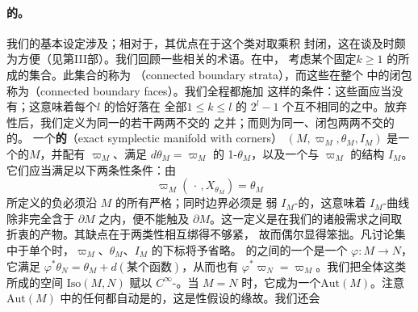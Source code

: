 \paragraph{\trCorneredBoundary{}的\trExactSymplectic\trManifold。}\label{sub:exact-symplectic-with-corners}
我们的基本设定涉及\trCorneredBoundary\trManifold；相对于\trManifoldWithBoundary，其优点在于这个类对取乘积%
封闭，这在谈及\trFibration{}时颇为方便（见第III部）。我们回顾一些相关的术语。在\trCorneredBoundary\trManifold{}中，
考虑某个固定\trCodimension{}$k\ge 1$ 的\trCornerPoint{}所成的集合。此集合的\trConnectedComponent{}称为%
\textbf{\trConnected\trBoundaryStratum}（connected boundary strata），而这些\trStratum{}在整个%
\trManifold{}中的闭包称为\textbf{\trConnected\trBoundaryFace}（connected boundary faces）。我们全程都施加
这样的条件：这些面应当没有\trSelfIntersection；这意味着每个\trCodimension{}$l$ 的\trCornerPoint{}恰好落在
全部\trCodimension{}$1\le k\le l$ 的 $2^l-1$ 个互不相同的\trConnected\trBoundaryFace{}之中。放弃%
\trConnected{}性后，我们定义\trBoundaryFace{}为同一\trCodimension{}的若干两两不交的%
\trConnected\trBoundaryFace{}之并；而\trBoundaryStratum{}则为同一\trCodimension{}、闭包两两不交的%
\trConnected\trBoundaryStratum{}的\trDisjointUnion。
一个\textbf{\trCorneredBoundary{}的\trExactSymplectic\trManifold}（exact symplectic manifold with corners）%
$(M,\varpi_M,\theta_M,I_M)$ 是一个\trCompact\trSmooth{}的\trCorneredBoundary\trManifold{}$M$，并配有%
\trSymplecticForm{}$\varpi_M$、满足 $d\theta_M=\varpi_M$ 的 1-\trForm{}$\theta_M$，以及一个与 $\varpi_M$%
\trCompatible{}的\trAlmostComplex{}结构 $I_M$。它们应当满足以下两条\trConvex{}性条件：由
\begin{equation*}
\varpi_M(\,\cdot\,,X_{\theta_M})=\theta_M
\end{equation*}
所定义的负\trLiouville\trVectorField{}必须沿 $M$ 的所有\trBoundaryFace{}严格\trIncoming；同时边界必须是%
弱 $I_M$-\trConvex{}的，这意味着 $I_M$-\trHolomorphic{}曲线除非完全含于 $\partial M$ 之内，便不能触及
$\partial M$。这一定义是在我们的诸般需求之间取折衷的产物。其缺点在于两类\trConvex{}性相互绑得不够紧，
故而偶尔显得笨拙。凡讨论集中于单个\trManifold{}时，$\varpi_M$、$\theta_M$、$I_M$ 的下标将予省略。
\trCorneredBoundary{}的\trExactSymplectic\trManifold{}之间的一个\trIsomorphism{}是一个%
\trDiffeomorphism{}$\varphi\colon M\to N$，它满足 $\varphi^*\theta_N=\theta_M+d(\text{某个函数})$，从而也有%
$\varphi^*\varpi_N=\varpi_M$。我们把全体这类\trIsomorphism{}所成的空间 $\mathrm{Iso}(M,N)$ 赋以%
$C^\infty$-\trTopology。当 $M=N$ 时，它成为一个\trTopologicalGroup{}$\mathrm{Aut}(M)$。注意%
$\mathrm{Aut}(M)$ 中的任何\trIsotopy{}都自动是\trHamiltonian{}的，这是\trExact{}性假设的缘故。我们还会
